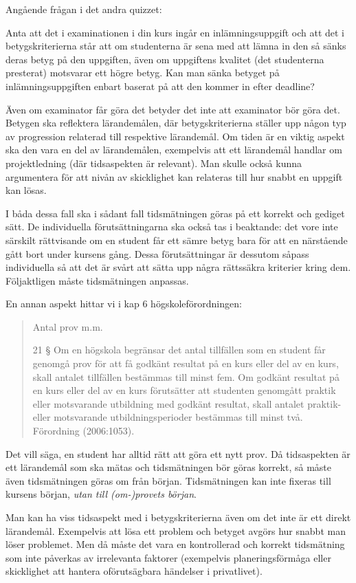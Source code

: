 Angående frågan i det andra quizzet:

Anta att det i examinationen i din kurs ingår en inlämningsuppgift och
att det i betygskriterierna står att om studenterna är sena med att
lämna in den så sänks deras betyg på den uppgiften, även om uppgiftens
kvalitet (det studenterna presterat) motsvarar ett högre betyg. Kan man
sänka betyget på inlämningsuppgiften enbart baserat på att den kommer in
efter deadline?

Även om examinator får göra det betyder det inte att examinator bör göra
det. Betygen ska reflektera lärandemålen, där betygskriterierna ställer
upp någon typ av progression relaterad till respektive lärandemål. Om
tiden är en viktig aspekt ska den vara en del av lärandemålen,
exempelvis att ett lärandemål handlar om projektledning (där
tidsaspekten är relevant). Man skulle också kunna argumentera för att
nivån av skicklighet kan relateras till hur snabbt en uppgift kan lösas.

I båda dessa fall ska i sådant fall tidsmätningen göras på ett korrekt
och gediget sätt. De individuella förutsättningarna ska också tas i
beaktande: det vore inte särskilt rättvisande om en student får ett
sämre betyg bara för att en närstående gått bort under kursens gång.
Dessa förutsättningar är dessutom såpass individuella så att det är
svårt att sätta upp några rättssäkra kriterier kring dem. Följaktligen
måste tidsmätningen anpassas.

En annan aspekt hittar vi i kap 6 högskoleförordningen:
\blockquote{%
  Antal prov m.m.

  21 § Om en högskola begränsar det antal tillfällen som en student får
  genomgå prov för att få godkänt resultat på en kurs eller del av en
  kurs, skall antalet tillfällen bestämmas till minst fem. Om godkänt
  resultat på en kurs eller del av en kurs förutsätter att studenten
  genomgått praktik eller motsvarande utbildning med godkänt resultat,
  skall antalet praktik- eller motsvarande utbildningsperioder bestämmas
  till minst två. Förordning (2006:1053).%
}

Det vill säga, en student har alltid rätt att göra ett nytt prov. Då
tidsaspekten är ett lärandemål som ska mätas och tidsmätningen bör göras
korrekt, så måste även tidsmätningen göras om från början. Tidsmätningen
kan inte fixeras till kursens början, \emph{utan till (om-)provets
början}.

Man kan ha viss tidsaspekt med i betygskriterierna även om det inte är
ett direkt lärandemål. Exempelvis att lösa ett problem och betyget
avgörs hur snabbt man löser problemet. Men då måste det vara en
kontrollerad och korrekt tidsmätning som inte påverkas av irrelevanta
faktorer (exempelvis planeringsförmåga eller skicklighet att hantera
oförutsägbara händelser i privatlivet).

